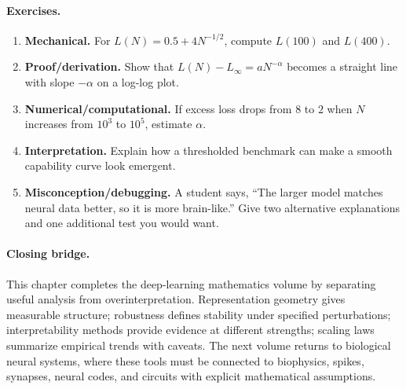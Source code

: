 \paragraph{Exercises.}
\begin{enumerate}[label=\textbf{42.4.\arabic*.}, leftmargin=*]
\item \textbf{Mechanical.} For \(L(N)=0.5+4N^{-1/2}\), compute \(L(100)\) and \(L(400)\).
\item \textbf{Proof/derivation.} Show that \(L(N)-L_\infty=aN^{-\alpha}\) becomes a straight line with slope \(-\alpha\) on a log-log plot.
\item \textbf{Numerical/computational.} If excess loss drops from \(8\) to \(2\) when \(N\) increases from \(10^3\) to \(10^5\), estimate \(\alpha\).
\item \textbf{Interpretation.} Explain how a thresholded benchmark can make a smooth capability curve look emergent.
\item \textbf{Misconception/debugging.} A student says, ``The larger model matches neural data better, so it is more brain-like.'' Give two alternative explanations and one additional test you would want.
\end{enumerate}

\paragraph{Closing bridge.}
This chapter completes the deep-learning mathematics volume by separating useful analysis from overinterpretation. Representation geometry gives measurable structure; robustness defines stability under specified perturbations; interpretability methods provide evidence at different strengths; scaling laws summarize empirical trends with caveats. The next volume returns to biological neural systems, where these tools must be connected to biophysics, spikes, synapses, neural codes, and circuits with explicit mathematical assumptions.

\clearpage

